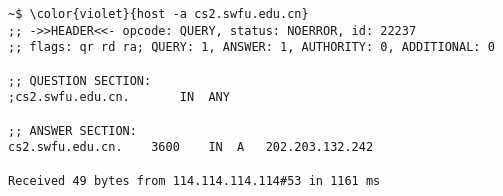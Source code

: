\documentclass[varwidth=36em]{standalone}
\begin{document}
\begin{Verbatim}[commandchars=\\\{\}]
~$ \color{violet}{host -a cs2.swfu.edu.cn}
;; ->>HEADER<<- opcode: QUERY, status: NOERROR, id: 22237
;; flags: qr rd ra; QUERY: 1, ANSWER: 1, AUTHORITY: 0, ADDITIONAL: 0

;; QUESTION SECTION:
;cs2.swfu.edu.cn.       IN  ANY

;; ANSWER SECTION:
cs2.swfu.edu.cn.    3600    IN  A   202.203.132.242

Received 49 bytes from 114.114.114.114#53 in 1161 ms
\end{Verbatim}
\end{document}
